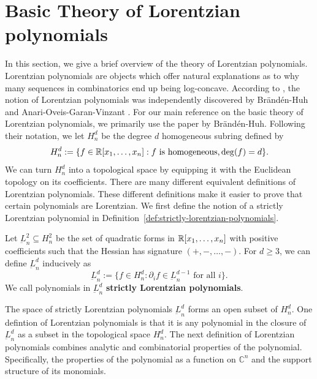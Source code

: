 \documentclass{puthesis-UG}
\begin{document}
\section{Basic Theory of Lorentzian polynomials} \label{sec:lorentzian-polynomials}

In this section, we give a brief overview of the theory of Lorentzian polynomials. Lorentzian polynomials are objects which offer natural explanations as to why many sequences in combinatorics end up being log-concave. According to \cite{baker_2022}, the notion of Lorentzian polynomials was independently discovered by Brändén-Huh \cite{lorentzian-polynomials} and Anari-Oveis-Garan-Vinzant \cite{anari2018logconcave}. For our main reference on the basic theory of Lorentzian polynomials, we primarily use the paper \cite{lorentzian-polynomials} by Brändén-Huh. Following their notation, we let $H_n^d$ be the degree $d$ homogeneous subring defined by 
\[
	H_n^d := \{f \in \mathbb{R}[x_1, \ldots, x_n] : \text{$f$ is homogeneous,} \deg (f) = d\}.
\] 
We can turn $H_n^d$ into a topological space by equipping it with the Euclidean topology on its coefficients. There are many different equivalent definitions of Lorentzian polynomials. These different definitions make it easier to prove that certain polynomials are Lorentzian. We first define the notion of a strictly Lorentzian polynomial in Definition~\ref{def:strictly-lorentzian-polynomials}. 

\begin{defn} \label{def:strictly-lorentzian-polynomials}
	Let $\underbar{L}_n^2 \subseteq H_n^2$ be the set of quadratic forms in $\mathbb{R}[x_1, \ldots, x_n]$ with positive coefficients such that the Hessian has signature $(+, -, \ldots, -)$. For $d \geq 3$, we can define $\underbar{L}_n^d$ inducively as
	\[
		\underbar{L}_n^d := \{f \in H_n^d : \partial_i f \in \underbar{L}_n^{d-1} \text{ for all $i$}\}.
	\] 
	We call polynomials in $\underbar{L}_n^d$ \textbf{strictly Lorentzian polynomials}. 
\end{defn}

The space of strictly Lorentzian polynomials $\underbar{L}_n^d$ forms an open subset of $H_n^d$. One defintion of Lorentzian polynomials is that it is any polynomial in the closure of $\underbar{L}_n^d$ as a subset in the topological space $H_n^d$. The next definition of Lorentzian polynomials combines analytic and combinatorial properties of the polynomial. Specifically, the properties of the polynomial as a function on $\mathbb{C}^n$ and the support structure of its monomials. 
\end{document}
